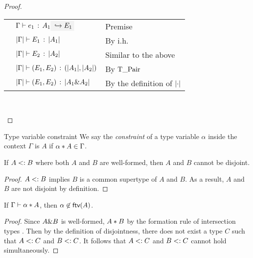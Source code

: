 \begin{proof}
\begin{itemize}
    \begin{tabular}{rll}
      & $ \hastype \Gamma {e_1} {A_1} \yields {E_1} $ & Premise \\
      & $ \lvert \Gamma \rvert \vdash E_1 \ \!:\! \ \lvert A_1 \rvert $ & By i.h. \\
      & $ \lvert \Gamma \rvert \vdash E_2 \ \!:\! \ \lvert A_2 \rvert $ & Similar to the above \\
      & $ \lvert \Gamma \rvert \vdash (E_1, E_2) \ \!:\! \ (\lvert A_1 \rvert, \lvert A_2 \rvert) $ & By $ \text{T\_}\text{Pair} $ \\
      & $ \lvert \Gamma \rvert \vdash (E_1, E_2) \ \!:\! \ \lvert A_1 \& A_2 \rvert $ & By the definition of $ \lvert \cdot \rvert $
    \end{tabular} \\

  \end{itemize}
\end{proof}

\begin{definition}{Type variable constraint}
  We say the \emph{constraint} of a type variable $\alpha$ inside the context
  $\Gamma$ is $A$ if $\alpha * A \in \Gamma$.
\end{definition}

\begin{lemma}
If $A <: B$ where both $A$ and $B$ are well-formed, then $A$ and $B$ cannot be disjoint.
\end{lemma}

\begin{proof}
$A <: B$ implies $B$ is a common supertype of $A$ and $B$. As a result, $A$ and $B$ are not disjoint by definition.
\end{proof}


\begin{lemma} \label{free-var-disjoint-bounds}
  If $\Gamma \vdash \alpha * A$, then $\alpha \not \in \textsf{ftv}(A)$.
\end{lemma}

\begin{proof}
Since $A \& B$ is well-formed, $A * B$ by the formation rule of intersection types . Then by the definition of disjointness, there does not exist a type $C$ such that $A <: C$ and $B <: C$. It follows that $A <: C$ and $B <: C$ cannot hold simultaneously.
\end{proof}

